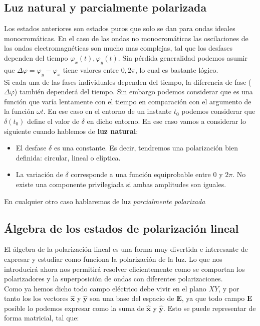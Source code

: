 \documentclass[12pt,a4paper]{article}
\newcommand{\En}{\mathbf{E}}
\newcommand{\hnx}{\hat{\mathbf{x}}}
\newcommand{\hny}{\hat{\mathbf{y}}}
\numberwithin{equation}{section}
\numberwithin{figure}{section}
\begin{document}
\subsection{Luz natural y parcialmente polarizada}

Los estados anteriores son estados puros que solo se dan para ondas ideales monocromáticas. En el caso de las ondas no monocromáticas las oscilaciones de las ondas electromagnéticas son mucho mas complejas, tal que los desfases dependen del tiempo $\varphi_x(t), \varphi_y (t)$. Sin pérdida generalidad podemos asumir que $\Delta \varphi = \varphi_y - \varphi_x$ tiene valores entre $0,2\pi$, lo cual es bastante lógico. \\

Si cada una de las fases individuales dependen del tiempo, la diferencia de fase ($\Delta \varphi$) también dependerá del tiempo. Sin embargo podemos considerar que es una función que varía lentamente con el tiempo en comparación con el argumento de la función $\omega t$. En ese caso en el entorno de un instante $t_0$ podemos considerar que $\delta(t_0)$ define el valor de $\delta$ en dicho entorno. En ese caso vamos a considerar lo siguiente cuando hablemos de \textbf{luz natural}:

\begin{itemize}
\item El desfase $\delta$ es una constante. Es decir, tendremos una polarización bien definida: circular, lineal o elíptica.
\item La variación de $\delta$ corresponde a una función equiprobable entre $0$ y $2 \pi$. No existe una componente privilegiada si ambas amplitudes son iguales.
\end{itemize}
En cualquier otro caso hablaremos de luz \textit{parcialmente polarizada}

\subsection{Álgebra de los estados de polarización lineal}

El álgebra de la polarización lineal es una forma muy divertida e interesante de expresar y estudiar como funciona la polarización de la luz. Lo que nos introducirá ahora nos permitirá resolver eficientemente como se comportan los polarizadores y la superposición de ondas con diferentes polarizaciones. \\

Como ya hemos dicho todo campo eléctrico debe vivir en el plano $XY$, y por tanto los  los vectores $\hnx$ y $\hny$ son una base del espacio de $\En$, ya que todo campo $\En$ posible lo podemos expresar como la suma de $\hnx$ y $\hny$. Esto se puede representar de forma matricial, tal que:
\end{document}
